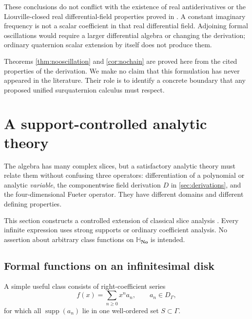\documentclass[11pt,letterpaper]{article}
\numberwithin{equation}{section}
\theoremstyle{definition}
\theoremstyle{remark}
\newcommand{\No}{\mathbf{No}}
\newcommand{\SQ}{\mathbb H_{\No}}
\newcommand{\supp}{\operatorname{supp}}
\begin{document}
These conclusions do not conflict with the existence of real antiderivatives or the
Liouville-closed real differential-field properties proved in \cite{BM}. A constant
imaginary frequency is not a scalar coefficient in that real differential field. Adjoining
formal oscillations would require a larger differential algebra or changing the derivation;
ordinary quaternion scalar extension by itself does not produce them.

Theorems \ref{thm:nooscillation} and \ref{cor:nochain} are proved here from the cited
properties of the derivation. We make no claim that this formulation has never appeared in
the literature. Their role is to identify a concrete boundary that any proposed unified
surquaternion calculus must respect.

\section{A support-controlled analytic theory}\label{sec:analysis}

The algebra has many complex slices, but a satisfactory analytic theory must relate them
without confusing three operators: differentiation of a polynomial or analytic \emph{variable},
the componentwise field derivation $D$ in \cref{sec:derivations}, and the four-dimensional
Fueter operator. They have different domains and different defining properties.

This section constructs a controlled extension of classical slice analysis \cite{GP}.
Every infinite expression uses strong supports or ordinary coefficient analysis. No assertion
about arbitrary class functions on $\SQ$ is intended.

\subsection{Formal functions on an infinitesimal disk}
A simple useful class consists of right-coefficient series
\begin{equation}\label{eq:formalseries}
 f(x)=\sum_{n\ge0}x^na_n,
 \qquad a_n\in D_\Gamma,
\end{equation}
for which all $\supp(a_n)$ lie in one well-ordered set $S\subset\Gamma$.
\end{document}
